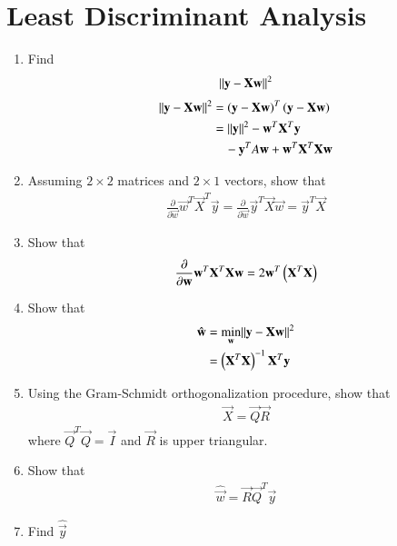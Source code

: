 \documentclass[journal,12pt,twocolumn]{IEEEtran}
\renewcommand\thesection{\arabic{section}}
\begin{document}
\section{Least Discriminant Analysis}
\begin{enumerate}[label=\thesection.\arabic*
,ref=\thesection.\theenumi]
\item Find
\begin{align}
\lVert\mathbf{y}-\mathbf{X}\mathbf{w}\rVert^2
\end{align}
\solution
\begin{align}
\lVert\mathbf{y}-\mathbf{X}\mathbf{w}\rVert^2 &= \left(\mathbf{y}-\mathbf{X}\mathbf{w}\right)^T\left(\mathbf{y}-\mathbf{X}\mathbf{w}\right)
\\
&= \lVert\mathbf{y}\rVert^2 - \mathbf{w}^T\mathbf{X}^T\mathbf{y} 
\\
& \quad - \mathbf{y}^TA\mathbf{w}+\mathbf{w}^T\mathbf{X}^T\mathbf{X}\mathbf{w}
\end{align}
%
\item Assuming $2\times 2$ matrices and $2 \times 1$ vectors, show that
\begin{align}
\frac{\partial}{\partial\vec{w}}\vec{w}^T\vec{X}^T\vec{y} = \frac{\partial}{\partial\vec{w}}\vec{y}^T\vec{X}\vec{w} = 
\vec{y}^T\vec{X}
\end{align}
\item Show that
\begin{align}
\frac{\partial}{\partial\mathbf{w}}\mathbf{w}^T\mathbf{X}^T\mathbf{X}\mathbf{w} = 2\mathbf{w}^T\left(\mathbf{X}^T\mathbf{X}\right)
\end{align}
\item Show that 
\begin{align}
\hat{\mathbf{w}} &= \min_{\mathbf{w}}\lVert\mathbf{y}-\mathbf{X}\mathbf{w}\rVert^2
\\
 &= \left(\mathbf{X}^T\mathbf{X}\right)^{-1}\mathbf{X}^T \mathbf{y}
\end{align}
\item  Using the Gram-Schmidt orthogonalization procedure, show that 
\begin{align}
\vec{X} = \vec{Q}\vec{R}
\end{align}
%
where $\vec{Q}^T\vec{Q} = \vec{I}$ and $\vec{R}$ is upper triangular.
\item Show that  
\begin{align}
\hat{\vec{w}} =\vec{R} \vec{Q}^T \vec{y}
\end{align}
%
\item Find $ \hat{\vec{y}}$

\end{enumerate}
%

%
\end{document}
